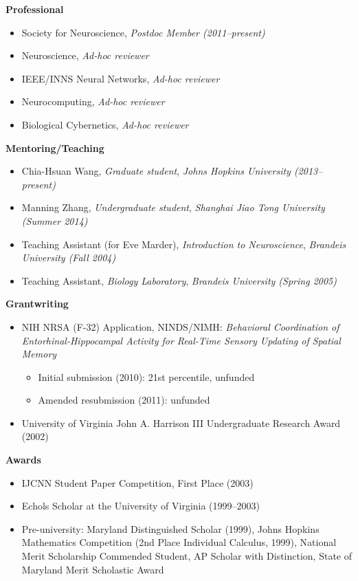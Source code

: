 \documentclass[10pt]{article}
\begin{document}
{\large \textbf{Professional}}
\begin{itemize}
    \item Society for Neuroscience, \emph{Postdoc Member (2011--present)}
    \item Neuroscience, \emph{Ad-hoc reviewer}
    \item IEEE/INNS Neural Networks, \emph{Ad-hoc reviewer}
    \item Neurocomputing, \emph{Ad-hoc reviewer}
    \item Biological Cybernetics, \emph{Ad-hoc reviewer}
\end{itemize}
    
{\large \textbf{Mentoring/Teaching}}
\begin{itemize}
    \item Chia-Hsuan Wang, \emph{Graduate student}, \emph{Johns Hopkins University (2013--present)}
    \item Manning Zhang, \emph{Undergraduate student}, \emph{Shanghai Jiao Tong University (Summer 2014)}
    \item Teaching Assistant (for Eve Marder), \emph{Introduction to Neuroscience}, \emph{Brandeis University (Fall 2004)}
    \item Teaching Assistant, \emph{Biology Laboratory}, \emph{Brandeis University (Spring 2005)}
\end{itemize}

{\large \textbf{Grantwriting}}
\begin{itemize}
    \item NIH NRSA (F-32) Application, NINDS/NIMH: \emph{Behavioral Coordination of Entorhinal-Hippocampal Activity for Real-Time Sensory Updating of Spatial Memory}
    \begin{itemize}
        \item Initial submission (2010): 21st percentile, unfunded
        \item Amended resubmission (2011): unfunded
    \end{itemize}
    \item University of Virginia John A. Harrison III Undergraduate Research Award (2002)
\end{itemize}

{\large \textbf{Awards}}
\begin{itemize}
    \item IJCNN Student Paper Competition, First Place (2003)
    \item Echols Scholar at the University of Virginia (1999--2003) 
    \item Pre-university: Maryland Distinguished Scholar (1999), Johns Hopkins Mathematics Competition (2nd Place Individual Calculus, 1999), National Merit Scholarship Commended Student, AP Scholar with Distinction, State of Maryland Merit Scholastic Award 
\end{itemize}

\end{document}
